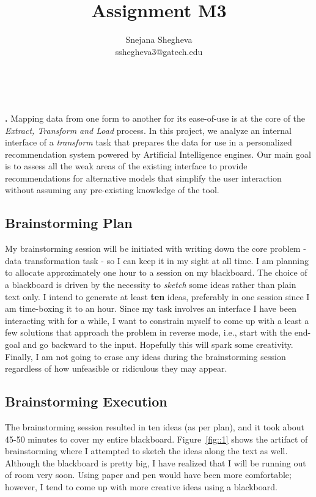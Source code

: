 \documentclass[12pt,letterpaper]{article}
\makeatletter
\renewcommand{\maketitle}{\bgroup
   \begin{center}
   \textbf{{\fontsize{18pt}{20}\selectfont \@title}}\\
   \vspace{10pt}
   {\fontsize{12pt}{0}\selectfont \@author} 
   \end{center}
}
\newenvironment{myquote}[1]%
  {\list{}{\leftmargin=#1\rightmargin=#1}\item[]}%
  {\endlist}
\renewenvironment{abstract}
{\vspace*{-.5in}\fontsize{12pt}{12}\begin{myquote}{.5in}
\noindent \par{\bfseries \abstractname.}}
{\medskip\noindent
\end{myquote}
}
\makeatother
\begin{document}
\title{Assignment M3}
\author{Snejana Shegheva \\ sshegheva3@gatech.edu}

\maketitle
\thispagestyle{fancy}

\begin{abstract}
Mapping data from one form to another for its ease-of-use is at the core of the \textit{Extract, Transform and Load} process. In this project, we analyze an internal interface of a \textit{transform} task that prepares the data for use in a personalized recommendation system powered by Artificial Intelligence engines. Our main goal is to assess all the weak areas of the existing interface to provide recommendations for alternative models that simplify the user interaction without assuming any pre-existing knowledge of the tool.
\end{abstract}

\subsection*{Brainstorming Plan}
My brainstorming session will be initiated with writing down the core problem - data transformation task - so I can keep it in my sight at all time. I am planning to allocate approximately one hour to a session on my blackboard. The choice of a blackboard is driven by the necessity to \textit{sketch} some ideas rather than plain text only. I intend to generate at least \textbf{ten} ideas, preferably in one session since I am time-boxing it to an hour. Since my task involves an interface I have been interacting with for a while, I want to constrain myself to come up with a least a few solutions that approach the problem in reverse mode, i.e., start with the end-goal and go backward to the input. Hopefully this will spark some creativity. Finally, I am not going to erase any ideas during the brainstorming session regardless of how unfeasible or ridiculous they may appear. 

\subsection*{Brainstorming Execution}
The brainstorming session resulted in ten ideas (as per plan), and it took about 45-50 minutes to cover my entire blackboard. Figure~\ref{fig::1} shows the artifact of brainstorming where I attempted to sketch the ideas along the text as well. Although the blackboard is pretty big, I have realized that I will be running out of room very soon. Using paper and pen would have been more comfortable; however, I tend to come up with more creative ideas using a blackboard.
\end{document}
